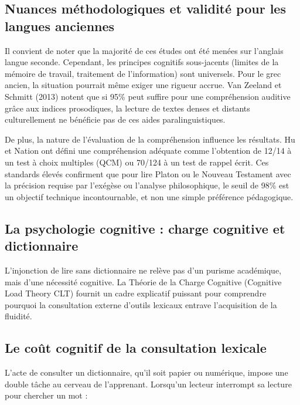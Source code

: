 {\subsection{Nuances méthodologiques et validité pour les langues anciennes}

Il convient de noter que la majorité de ces études ont été menées sur l'anglais langue seconde.
Cependant, les principes cognitifs sous-jacents (limites de la mémoire de travail, traitement de
l'information) sont universels. Pour le grec ancien, la situation pourrait même exiger une rigueur
accrue. Van Zeeland et Schmitt (2013) notent que si 95\% peut suffire pour une compréhension
auditive grâce aux indices prosodiques, la lecture de textes denses et distants culturellement ne
bénéficie pas de ces aides paralinguistiques.\cite{III-1-2-ref7}

De plus, la nature de l'évaluation de la compréhension influence les résultats. Hu et Nation ont
défini une compréhension adéquate comme l'obtention de 12/14 à un test à choix multiples (QCM) ou
70/124 à un test de rappel écrit.\cite{III-1-2-ref12} Ces standards élevés confirment que pour lire
Platon ou le Nouveau Testament avec la précision requise par l'exégèse ou l'analyse philosophique,
le seuil de 98\% est un objectif technique incontournable, et non une simple préférence pédagogique.



\subsection{La psychologie cognitive : charge cognitive et dictionnaire}

L'injonction de \og lire sans dictionnaire\fg{} ne relève pas d'un purisme académique, mais d'une
nécessité cognitive. La Théorie de la Charge Cognitive (Cognitive Load Theory \- CLT) fournit un
cadre explicatif puissant pour comprendre pourquoi la consultation externe d'outils lexicaux entrave
l'acquisition de la fluidité.



\subsection{Le coût cognitif de la consultation lexicale}

L'acte de consulter un dictionnaire, qu'il soit papier ou numérique, impose une \og double
tâche\fg{} au cerveau de l'apprenant. Lorsqu'un lecteur interrompt sa lecture pour chercher un mot :

}
